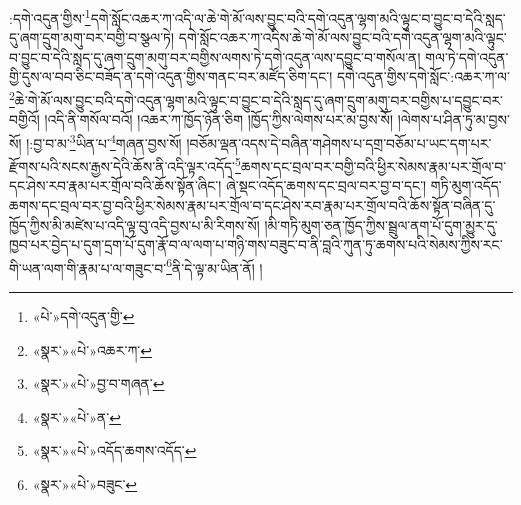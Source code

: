 :དགེ་འདུན་གྱིས་\footnote{«པེ་»དགེ་འདུན་གྱི་}དགེ་སློང་འཆར་ཀ་འདི་ལ་ཆེ་གེ་མོ་ལས་བྱུང་བའི་དགེ་འདུན་ལྷག་མའི་ལྟུང་བ་བྱུང་བ་དེའི་སླད་དུ་ཞག་དྲུག་མགུ་བར་བགྱི་བ་སྩལ་ཏེ། དགེ་སློང་འཆར་ཀ་འདིས་ཆེ་གེ་མོ་ལས་བྱུང་བའི་དགེ་འདུན་ལྷག་མའི་ལྟུང་བ་བྱུང་བ་དེའི་སླད་དུ་ཞག་དྲུག་མགུ་བར་བགྱིས་ལགས་ཏེ་དགེ་འདུན་ལས་དབྱུང་བ་གསོལ་ན། གལ་ཏེ་དགེ་འདུན་གྱི་དུས་ལ་བབ་ཅིང་བཟོད་ན་དགེ་འདུན་གྱིས་གནང་བར་མཛོད་ཅིག་དང་། དགེ་འདུན་གྱིས་དགེ་སློང་:འཆར་ཀ་ལ་\footnote{«སྣར་»«པེ་»འཆར་ཀ་}ཆེ་གེ་མོ་ལས་བྱུང་བའི་དགེ་འདུན་ལྷག་མའི་ལྟུང་བ་བྱུང་བ་དེའི་སླད་དུ་ཞག་དྲུག་མགུ་བར་བགྱིས་པ་དབྱུང་བར་བགྱིའོ། །འདི་ནི་གསོལ་བའོ། །འཆར་ཀ་ཁྱོད་ཉོན་ཅིག །ཁྱོད་ཀྱིས་ལེགས་པར་མ་བྱས་སོ། །ལེགས་པ་ཤིན་ཏུ་མ་བྱས་སོ། །:བྱ་བ་མ་\footnote{«སྣར་»«པེ་»བྱ་བ་གཞན་}ཡིན་པ་\footnote{«སྣར་»«པེ་»ན་}གཞན་བྱས་སོ། །བཅོམ་ལྡན་འདས་དེ་བཞིན་གཤེགས་པ་དགྲ་བཅོམ་པ་ཡང་དག་པར་རྫོགས་པའི་སངས་རྒྱས་དེའི་ཆོས་ནི་འདི་ལྟར་འདོད་\footnote{«སྣར་»«པེ་»འདོད་ཆགས་འདོད་}ཆགས་དང་བྲལ་བར་བགྱི་བའི་ཕྱིར་སེམས་རྣམ་པར་གྲོལ་བ་དང་ཤེས་རབ་རྣམ་པར་གྲོལ་བའི་ཆོས་སྟོན་ཞིང་། ཞེ་སྡང་འདོད་ཆགས་དང་བྲལ་བར་བྱ་བ་དང་། གཏི་མུག་འདོད་ཆགས་དང་བྲལ་བར་བྱ་བའི་ཕྱིར་སེམས་རྣམ་པར་གྲོལ་བ་དང་ཤེས་རབ་རྣམ་པར་གྲོལ་བའི་ཆོས་སྟོན་བཞིན་དུ་ཁྱོད་ཀྱིས་མི་མཛེས་པ་འདི་ལྟ་བུ་འདི་བྱས་པ་མི་རིགས་སོ། །མི་གཏི་མུག་ཅན་ཁྱོད་ཀྱིས་སྦྲུལ་ནག་པོ་དུག་མྱུར་དུ་ཁྱབ་པར་བྱེད་པ་དུག་དྲག་པོ་དུག་རྣོ་བ་ལ་ལག་པ་གཉི་གས་བཟུང་བ་ནི་བླའི་ཀུན་ཏུ་ཆགས་པའི་སེམས་ཀྱིས་རང་གི་ཡན་ལག་གི་རྣམ་པ་ལ་གཟུང་བ་\footnote{«སྣར་»«པེ་»བཟུང་}ནི་དེ་ལྟ་མ་ཡིན་ནོ། །
